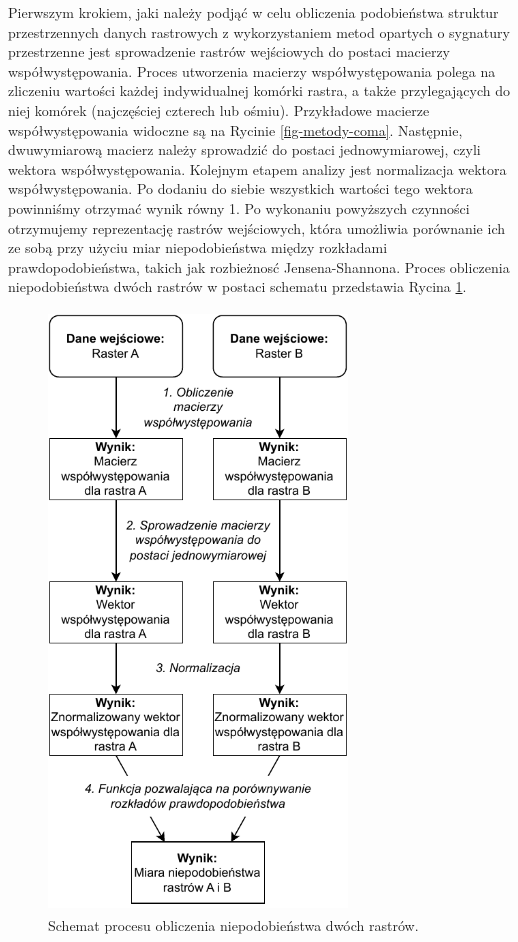 \documentclass{amuthesis}
\begin{document}
Pierwszym krokiem, jaki należy podjąć w celu obliczenia podobieństwa
struktur przestrzennych danych rastrowych z wykorzystaniem metod
opartych o sygnatury przestrzenne jest sprowadzenie rastrów wejściowych
do postaci macierzy współwystępowania. Proces utworzenia macierzy
współwystępowania polega na zliczeniu wartości każdej indywidualnej
komórki rastra, a także przylegających do niej komórek (najczęściej
czterech lub ośmiu). Przykładowe macierze współwystępowania widoczne są
na Rycinie \ref{fig-metody-coma}. Następnie, dwuwymiarową macierz należy
sprowadzić do postaci jednowymiarowej, czyli wektora współwystępowania.
Kolejnym etapem analizy jest normalizacja wektora współwystępowania. Po
dodaniu do siebie wszystkich wartości tego wektora powinniśmy otrzymać
wynik równy 1. Po wykonaniu powyższych czynności otrzymujemy
reprezentację rastrów wejściowych, która umożliwia porównanie ich ze
sobą przy użyciu miar niepodobieństwa między rozkładami
prawdopodobieństwa, takich jak rozbieżnosć Jensena-Shannona. Proces
obliczenia niepodobieństwa dwóch rastrów w postaci schematu przedstawia
Rycina \ref{fig-schemat-porownanie}.

\begin{figure}[t]

{\centering \includegraphics[width=3.125in,height=6.25in]{figures/diagram_raster_comparison.pdf}

}

\caption{\label{fig-schemat-porownanie}Schemat procesu obliczenia
niepodobieństwa dwóch rastrów.}

\end{figure}
\end{document}
